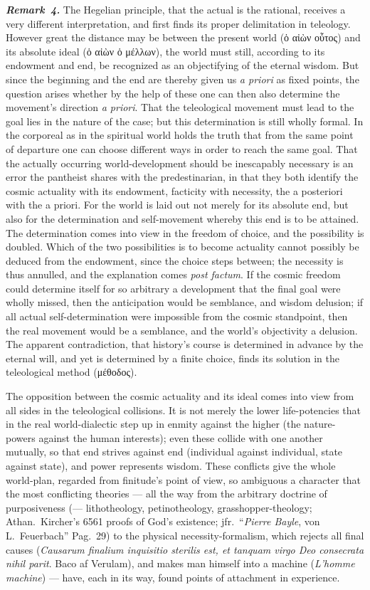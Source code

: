 \documentclass[12pt]{book}
\newcommand{\anm}[1]{\emph{\textbf{Remark~#1.}}}
\begin{document}
\anm{4} The Hegelian principle, that the actual is the rational, receives a
very different interpretation, and first finds its proper delimitation in
teleology. However great the distance may be between the present world
(ὁ αἰὼν οὗτος) and its absolute ideal (ὁ αἰὼν ὁ μέλλων), the world must
still, according to its endowment and end, be recognized as an objectifying
of the eternal wisdom. But since the beginning and the end are thereby given
us \textit{a priori} as fixed points, the question arises whether by the
help of these one can then also determine the movement's direction
\textit{a priori}. That the teleological movement must lead to the goal lies
in the nature of the case; but this determination is still wholly formal. In
the corporeal as in the spiritual world holds the truth that from the same
point of departure one can choose different ways in order to reach the same
goal. That the actually occurring world-development should be inescapably
necessary is an error the pantheist shares with the predestinarian, in that
they both identify the cosmic actuality with its endowment, facticity with
necessity, the a posteriori with the a priori. For the world is laid out not
merely for its absolute end, but also for the determination and
self-movement whereby this end is to be attained. The determination comes
into view in the freedom of choice, and the possibility is doubled. Which of
the two possibilities is to become actuality cannot possibly be deduced from
the endowment, since the choice steps between; the necessity is thus
annulled, and the explanation comes \textit{post factum}. If the cosmic
freedom could determine itself for so arbitrary a development that the final
goal were wholly missed, then the anticipation would be semblance, and
wisdom delusion; if all actual self-determination were impossible from the
cosmic standpoint, then the real movement would be a semblance, and the
world's objectivity a delusion. The apparent contradiction, that history's
course is determined in advance by the eternal will, and yet is determined
by a finite choice, finds its solution in the teleological method
(μέθοδος).

The opposition between the cosmic actuality and its ideal comes into view
from all sides in the teleological collisions. It is not merely the lower
life-potencies that in the real world-dialectic step up in enmity against
the higher (the nature-powers against the human interests); even these
collide with one another mutually, so that end strives against end
(individual against individual, state against state), and power represents
wisdom. These conflicts give the whole world-plan, regarded from finitude's
point of view, so ambiguous a character that the most conflicting theories
--- all the way from the arbitrary doctrine of purposiveness (---
lithotheology, petinotheology, grasshopper-theology; Athan.\ Kircher's 6561
proofs of God's existence; jfr.\ ``\textit{Pierre Bayle}, von L.\
Feuerbach'' Pag.\ 29) to the physical necessity-formalism, which rejects all
final causes (\textit{Causarum finalium inquisitio sterilis est, et tanquam
virgo Deo consecrata nihil parit}. Baco af Verulam), and makes man himself
into a machine (\textit{L'homme machine}) --- have, each in its way, found
points of attachment in experience.
\end{document}
